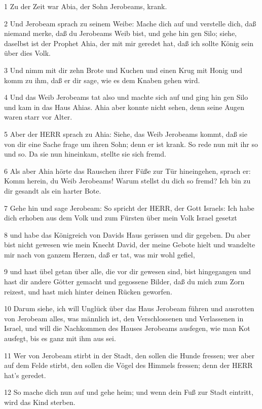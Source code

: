 \par 1 Zu der Zeit war Abia, der Sohn Jerobeams, krank.
\par 2 Und Jerobeam sprach zu seinem Weibe: Mache dich auf und verstelle dich, daß niemand merke, daß du Jerobeams Weib bist, und gehe hin gen Silo; siehe, daselbst ist der Prophet Ahia, der mit mir geredet hat, daß ich sollte König sein über dies Volk.
\par 3 Und nimm mit dir zehn Brote und Kuchen und einen Krug mit Honig und komm zu ihm, daß er dir sage, wie es dem Knaben gehen wird.
\par 4 Und das Weib Jerobeams tat also und machte sich auf und ging hin gen Silo und kam in das Haus Ahias. Ahia aber konnte nicht sehen, denn seine Augen waren starr vor Alter.
\par 5 Aber der HERR sprach zu Ahia: Siehe, das Weib Jerobeams kommt, daß sie von dir eine Sache frage um ihren Sohn; denn er ist krank. So rede nun mit ihr so und so. Da sie nun hineinkam, stellte sie sich fremd.
\par 6 Als aber Ahia hörte das Rauschen ihrer Füße zur Tür hineingehen, sprach er: Komm herein, du Weib Jerobeams! Warum stellst du dich so fremd? Ich bin zu dir gesandt als ein harter Bote.
\par 7 Gehe hin und sage Jerobeam: So spricht der HERR, der Gott Israels: Ich habe dich erhoben aus dem Volk und zum Fürsten über mein Volk Israel gesetzt
\par 8 und habe das Königreich von Davids Haus gerissen und dir gegeben. Du aber bist nicht gewesen wie mein Knecht David, der meine Gebote hielt und wandelte mir nach von ganzem Herzen, daß er tat, was mir wohl gefiel,
\par 9 und hast übel getan über alle, die vor dir gewesen sind, bist hingegangen und hast dir andere Götter gemacht und gegossene Bilder, daß du mich zum Zorn reizest, und hast mich hinter deinen Rücken geworfen.
\par 10 Darum siehe, ich will Unglück über das Haus Jerobeam führen und ausrotten von Jerobeam alles, was männlich ist, den Verschlossenen und Verlassenen in Israel, und will die Nachkommen des Hauses Jerobeams ausfegen, wie man Kot ausfegt, bis es ganz mit ihm aus sei.
\par 11 Wer von Jerobeam stirbt in der Stadt, den sollen die Hunde fressen; wer aber auf dem Felde stirbt, den sollen die Vögel des Himmels fressen; denn der HERR hat's geredet.
\par 12 So mache dich nun auf und gehe heim; und wenn dein Fuß zur Stadt eintritt, wird das Kind sterben.

